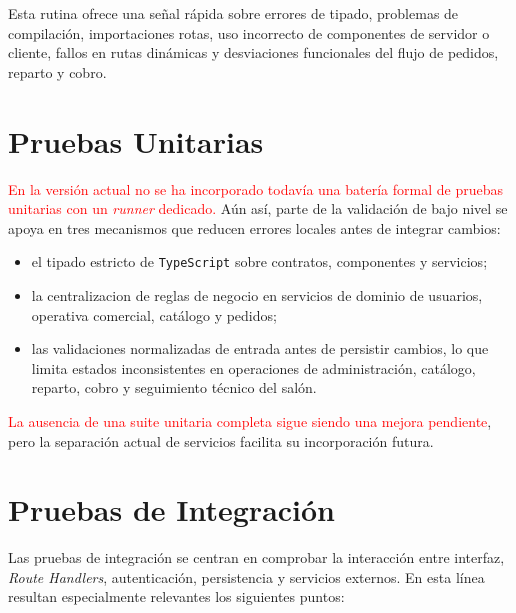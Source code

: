 Esta rutina ofrece una señal rápida sobre errores de tipado, problemas de compilación, importaciones rotas, uso incorrecto de componentes de servidor o cliente, fallos en rutas dinámicas y desviaciones funcionales del flujo de pedidos, reparto y cobro.

\section{Pruebas Unitarias}

\textcolor{red}{En la versión actual no se ha incorporado todavía una batería formal de pruebas unitarias con un \textit{runner} dedicado.} Aún así, parte de la validación de bajo nivel se apoya en tres mecanismos que reducen errores locales antes de integrar cambios:

\begin{itemize}
    \item el tipado estricto de \texttt{TypeScript} sobre contratos, componentes y servicios;
    \item la centralizacion de reglas de negocio en servicios de dominio de usuarios, operativa comercial, catálogo y pedidos;
    \item las validaciones normalizadas de entrada antes de persistir cambios, lo que limita estados inconsistentes en operaciones de administración, catálogo, reparto, cobro y seguimiento técnico del salón.
\end{itemize}

\textcolor{red}{La ausencia de una suite unitaria completa sigue siendo una mejora pendiente}, pero la separación actual de servicios facilita su incorporación futura.

\section{Pruebas de Integración}

Las pruebas de integración se centran en comprobar la interacción entre interfaz, \textit{Route Handlers}, autenticación, persistencia y servicios externos. En esta línea resultan especialmente relevantes los siguientes puntos:

